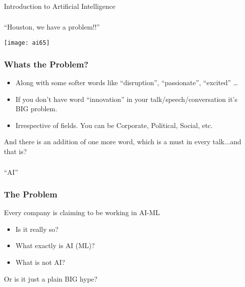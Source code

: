\begin{frame}[fragile]\frametitle{}
\begin{center}
{\Large Introduction to Artificial Intelligence}
\end{center}
\end{frame}
 
\begin{frame}[fragile]\frametitle{}
\begin{center}
{\Large ``Houston, we have a problem!!''}
\end{center}


			\begin{center}
			\texttt{[image: ai65]}
			\end{center}
			
\end{frame}

\begin{frame}[fragile]\frametitle{Whats the Problem?}
\begin{itemize}
\item Along with some softer words like ``disruption'', ``passionate'', ``excited'' \ldots
\item If you don't have word ``innovation'' in your talk/speech/conversation it's  BIG problem. 
\item Irrespective of fields. You can be Corporate, Political, Social, etc.
\end{itemize}


And there is an addition of one more word,  which is a must in every talk...and that is?


\end{frame}

\begin{frame}[fragile]\frametitle{}
\begin{center}
{\Large ``AI''}
\end{center}
\end{frame}


\begin{frame}[fragile]\frametitle{The Problem}
Every company is claiming to be working in AI-ML
\begin{itemize}
\item Is it really so?
\item What exactly is AI (ML)?
\item What is not AI?
\end{itemize}
Or is it just a plain BIG hype?
\end{frame}


